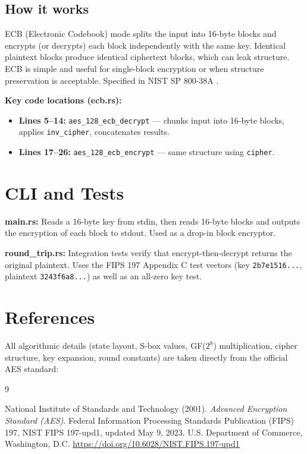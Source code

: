 \documentclass[11pt]{article}
\begin{document}
\subsection*{How it works}

ECB (Electronic Codebook) mode splits the input into 16-byte blocks and encrypts (or decrypts) each block independently with the same key. Identical plaintext blocks produce identical ciphertext blocks, which can leak structure. ECB is simple and useful for single-block encryption or when structure preservation is acceptable. Specified in NIST SP 800-38A \cite{NIST2001}.

\textbf{Key code locations (ecb.rs):}
\begin{itemize}
    \item \textbf{Lines 5--14:} \texttt{aes\_128\_ecb\_decrypt} --- chunks input into 16-byte blocks, applies \texttt{inv\_cipher}, concatenates results.
    \item \textbf{Lines 17--26:} \texttt{aes\_128\_ecb\_encrypt} --- same structure using \texttt{cipher}.
\end{itemize}

\section{CLI and Tests}

\textbf{main.rs:} Reads a 16-byte key from stdin, then reads 16-byte blocks and outputs the encryption of each block to stdout. Used as a drop-in block encryptor.

\textbf{round\_trip.rs:} Integration tests verify that encrypt-then-decrypt returns the original plaintext. Uses the FIPS 197 Appendix C test vectors (key \texttt{2b7e1516...}, plaintext \texttt{3243f6a8...}) \cite{NIST2001} as well as an all-zero key test.

\section{References}

All algorithmic details (state layout, S-box values, GF($2^8$) multiplication, cipher structure, key expansion, round constants) are taken directly from the official AES standard:

\begin{thebibliography}{9}

National Institute of Standards and Technology (2001).
\textit{Advanced Encryption Standard (AES)}.
Federal Information Processing Standards Publication (FIPS) 197, NIST FIPS 197-upd1, updated May 9, 2023.
U.S. Department of Commerce, Washington, D.C.
\url{https://doi.org/10.6028/NIST.FIPS.197-upd1}

\end{thebibliography}
\end{document}
